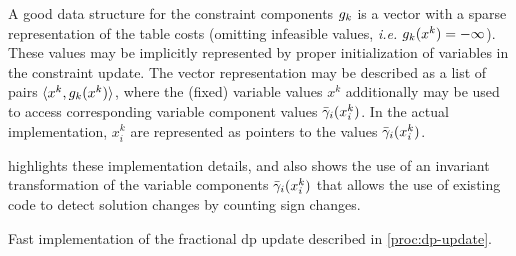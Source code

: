 A good data structure for the constraint components \(g_k\) is a vector with a sparse representation of the table costs (omitting infeasible values, \emph{i.e.} \(g_k(x^k) = -\infty\)).
These values may be implicitly represented by proper initialization of variables in the constraint update.
The vector representation may be described as a list of pairs \(\langle x^k, g_k(x^k)\rangle\), where the (fixed) variable values \(x^k\) additionally may be used to access corresponding variable component values \(\bar{\gamma}_i(x^k_i)\).
In the actual implementation, \(x^k_i\) are represented as pointers to the values \(\bar{\gamma}_i(x^k_i)\).

 highlights these implementation details, and also shows the use of an invariant transformation of the variable components \(\bar{\gamma}_i(x^k_i)\) that allows the use of existing code to detect solution changes by counting sign changes.

\begin{algorithm}[tbp]
	
	\caption{
		Fast implementation of the fractional \gls{dp} update described in \cref{proc:dp-update}.
	}
	\label{proc:frac-dp-update-fast}
\end{algorithm}


